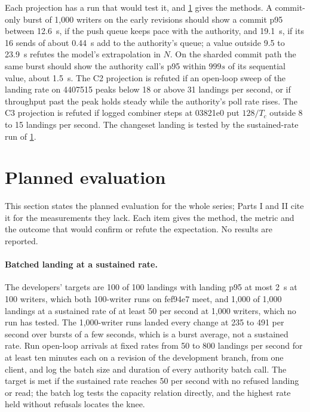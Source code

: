 \documentclass[11pt,letterpaper]{article}
\theoremstyle{definition}
\theoremstyle{remark}
\begin{document}
Each projection has a run that would test it, and \cref{sec:sgoc:planned} gives the methods. A commit-only burst of 1,000 writers on the early revisions should show a commit p95 between 12.6~s, if the push queue keeps pace with the authority, and 19.1~s, if its 16 sends of about 0.44~s add to the authority's queue; a value outside 9.5 to 23.9~s refutes the model's extrapolation in $N$. On the sharded commit path the same burst should show the authority call's p95 within $999s$ of its sequential value, about 1.5~s. The C2 projection is refuted if an open-loop sweep of the landing rate on 4407515 peaks below 18 or above 31 landings per second, or if throughput past the peak holds steady while the authority's poll rate rises. The C3 projection is refuted if logged combiner steps at 03821e0 put $128/T_c$ outside 8 to 15 landings per second. The changeset landing is tested by the sustained-rate run of \cref{sec:sgoc:planned}.

\section{Planned evaluation}
\label{sec:sgoc:planned}

This section states the planned evaluation for the whole series; Parts I and II cite it for the measurements they lack. Each item gives the method, the metric and the outcome that would confirm or refute the expectation. No results are reported.

\paragraph{Batched landing at a sustained rate.} The developers' targets are 100 of 100 landings with landing p95 at most 2~s at 100 writers, which both 100-writer runs on fef94e7 meet, and 1,000 of 1,000 landings at a sustained rate of at least 50 per second at 1,000 writers, which no run has tested. %
The 1,000-writer runs landed every change at 235 to 491 per second over bursts of a few seconds, which is a burst average, not a sustained rate. %
Run open-loop arrivals at fixed rates from 50 to 800 landings per second for at least ten minutes each on a revision of the development branch, from one client, and log the batch size and duration of every authority batch call. The target is met if the sustained rate reaches 50 per second with no refused landing or read; the batch log tests the capacity relation directly, and the highest rate held without refusals locates the knee.
\end{document}
